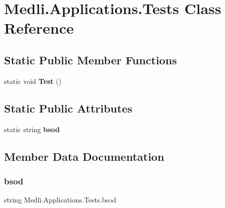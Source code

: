 \hypertarget{class_medli_1_1_applications_1_1_tests}{}\section{Medli.\+Applications.\+Tests Class Reference}
\label{class_medli_1_1_applications_1_1_tests}
\subsection*{Static Public Member Functions}
\begin{DoxyCompactItemize}
\item 
\mbox{\label{class_medli_1_1_applications_1_1_tests_a7bf04753f8a3eb6acfc1b5c07b1ec3cf}} 
static void {\bfseries Test} ()
\end{DoxyCompactItemize}
\subsection*{Static Public Attributes}
\begin{DoxyCompactItemize}
\item 
static string {\bfseries bsod}
\end{DoxyCompactItemize}


\subsection{Member Data Documentation}
\mbox{\label{class_medli_1_1_applications_1_1_tests_a50f3d58ea3dd03ad24e4e07c38dcf3a0}} 
\subsubsection{\texorpdfstring{bsod}{bsod}}
{\footnotesize\ttfamily string Medli.\+Applications.\+Tests.\+bsod\hspace{0.3cm}{\ttfamily [static]}}

